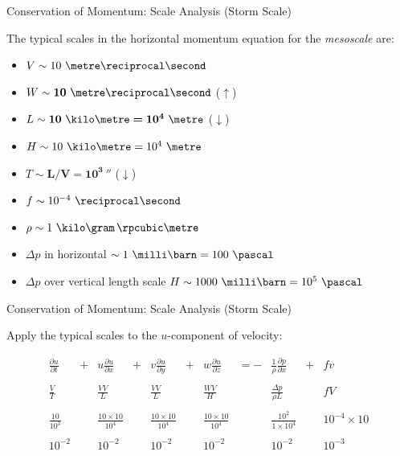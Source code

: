 \begin{frame}{Conservation of Momentum: Scale Analysis (Storm Scale)}

The typical scales in the horizontal momentum equation for the \textit{mesoscale} are:

\begin{itemize}
\item $V \sim 10\ \metre\reciprocal\second$
\item $W \sim \bm{10\ \metre\reciprocal\second}$ ($\bm{\uparrow}$)
\item $L \sim \bm{10\ \kilo\metre = 10^4\ \metre}$ ($\bm{\downarrow}$)
\item $H \sim 10\ \kilo\metre = 10^4\ \metre$
\item $T \sim \bm{L/V = 10^3\ \second}$ ($\bm{\downarrow}$)
\item $f \sim 10^{-4}\ \reciprocal\second$
\item $\rho \sim 1\ \kilo\gram \, \rpcubic\metre$
\item $\Delta p$ in horizontal $\sim 1\ \milli\barn = 100\ \pascal$
\item $\Delta p$ over vertical length scale $H \sim 1000\ \milli\barn = 10^5\ \pascal$
\end{itemize}
\end{frame}

\begin{frame}{Conservation of Momentum: Scale Analysis (Storm Scale)}

Apply the typical scales to the $u$-component of velocity:

\begin{align*}
&\frac{\partial u}{\partial t}& + &u \frac{\partial u}{\partial x}& + &v \frac{\partial u}{\partial y}&+ &w \frac{\partial u}{\partial z}& = -& \frac{1}{\rho} \frac{\partial p}{\partial x}& + &fv& \\\\
&\frac{V}{T}&  &\frac{VV}{L}& &\frac{VV}{L}& &\frac{WV}{H}& &\frac{\Delta p}{\rho L}& &fV&\\\\
&\frac{10}{10^3}& &\frac{10\times10}{10^4}& &\frac{10\times10}{10^4}& &\frac{10 \times 10}{10^4}& &\frac{10^2}{1 \times 10^4}& &10^{-4} \times 10&\\\\
&10^{-2}& &10^{-2}& &10^{-2}& &10^{-2}& &10^{-2}& &10^{-3}&
\end{align*}
\end{frame}

